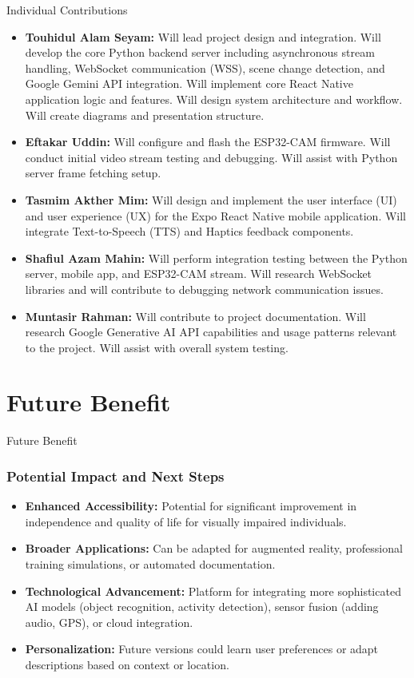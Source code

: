 \documentclass{beamer}
\begin{document}
\begin{frame}{Individual Contributions}
    \footnotesize
    \begin{itemize}
        \item \textbf{Touhidul Alam Seyam:} Will lead project design and integration. Will develop the core Python backend server including asynchronous stream handling, WebSocket communication (WSS), scene change detection, and Google Gemini API integration. Will implement core React Native application logic and features. Will design system architecture and workflow. Will create diagrams and presentation structure.

        \item \textbf{Eftakar Uddin:} Will configure and flash the ESP32-CAM firmware. Will conduct initial video stream testing and debugging. Will assist with Python server frame fetching setup.

        \item \textbf{Tasmim Akther Mim:} Will design and implement the user interface (UI) and user experience (UX) for the Expo React Native mobile application. Will integrate Text-to-Speech (TTS) and Haptics feedback components.

        \item \textbf{Shafiul Azam Mahin:} Will perform integration testing between the Python server, mobile app, and ESP32-CAM stream. Will research WebSocket libraries and will contribute to debugging network communication issues.

        \item \textbf{Muntasir Rahman:} Will contribute to project documentation. Will research Google Generative AI API capabilities and usage patterns relevant to the project. Will assist with overall system testing.
    \end{itemize}
\end{frame}

\section{Future Benefit}

\begin{frame}{Future Benefit}
    \frametitle{Potential Impact and Next Steps}
    \begin{itemize}
        \item \textbf{Enhanced Accessibility:} Potential for significant improvement in independence and quality of life for visually impaired individuals.
        \item \textbf{Broader Applications:} Can be adapted for augmented reality, professional training simulations, or automated documentation.
        \item \textbf{Technological Advancement:} Platform for integrating more sophisticated AI models (object recognition, activity detection), sensor fusion (adding audio, GPS), or cloud integration.
        \item \textbf{Personalization:} Future versions could learn user preferences or adapt descriptions based on context or location.
    \end{itemize}
\end{frame}
\end{document}
